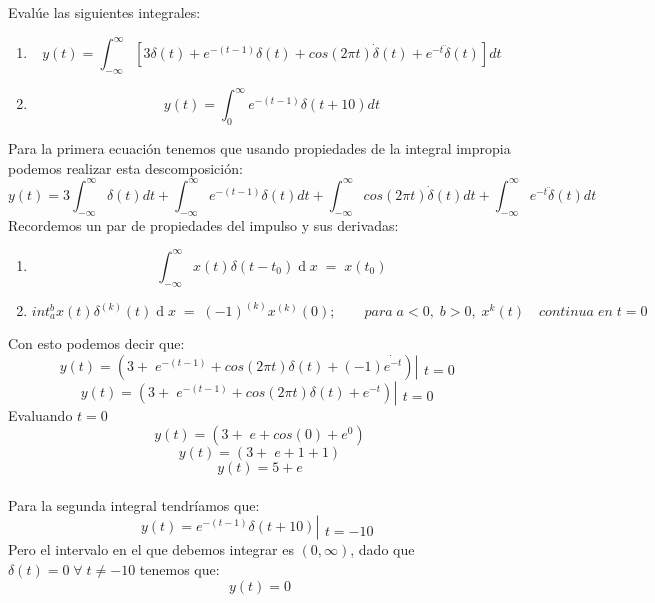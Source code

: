\documentclass[10pt,a4paper]{report}
\begin{document}
Evalúe las siguientes integrales:
\begin{enumerate}
  \item \[ y(t)=\int_{-\infty }^{\infty }[3\delta (t)+e^{-(t-1)}\delta (t)+cos(2\pi t)\dot{\delta}(t)+e^{-t}\ddot{\delta}(t)]dt \]

  \item \[ y(t)=\int_{0}^{\infty }e^{-(t-1)}\delta (t+10)dt \]

\end{enumerate}
Para la primera ecuación tenemos que usando propiedades de la integral impropia podemos realizar esta descomposición:
\[ y(t)=3\int_{-\infty }^{\infty }\delta (t)dt+\int_{-\infty }^{\infty }e^{-(t-1)}\delta (t)dt+\int_{-\infty }^{\infty }cos(2\pi t)\dot{\delta}(t)dt+\int_{-\infty }^{\infty }e^{-t}\ddot{\delta}(t)dt \]
Recordemos un par de propiedades del impulso y sus derivadas:
\begin{enumerate}
  \item \[ \int_{-\infty}^\infty x\left(t\right)\delta\left(t-t_0\right)\operatorname dx\;=\;x\left(t_0\right) \]
  \item \[ int_a^bx\left(t\right)\delta^{\left(k\right)}\left(t\right)\operatorname dx\;=\;\left(-1\right)^{\left(k\right)}x^{\left(k\right)}\left(0\right); \qquad para \;a<0,\;b>0, \;x^k\left(t\right) \quad continua\;en\;t=0 \]
\end{enumerate}
Con esto podemos decir que:
\[ y\left(t\right) = \left(3+\;e^{-\left(t-1\right)}+cos\left(2\pi t\right)\delta\left(t\right)+\left(-1\right)\dot{e^{-t}}\right)\left|\begin{array}{l}\\t=0\end{array}\right. \]
\[ y\left(t\right) = \left(3+\;e^{-\left(t-1\right)}+cos\left(2\pi t\right)\delta\left(t\right)+{e^{-t}}\right)\left|\begin{array}{l}\\t=0\end{array}\right. \]
Evaluando $t=0$
\[ y\left(t\right) = \left(3+\;e+cos\left(0\right)+e^0\right) \]
\[ y\left(t\right) = \left(3+\;e+1+1\right) \]
\[ y\left(t\right) = 5+e \]\\
Para la segunda integral tendríamos que:
\[ y\left(t\right)= e^{-\left(t-1\right)}\delta\left(t+10\right)\left|\begin{array}{l}\\t=-10\end{array}\right. \]
Pero el intervalo en el que debemos integrar es $\left(0,\infty\right)$, dado que $\delta\left(t\right) = 0 \; \forall \; t \neq -10$ tenemos que:
\[ y\left(t\right)= 0 \] 
\end{document}
